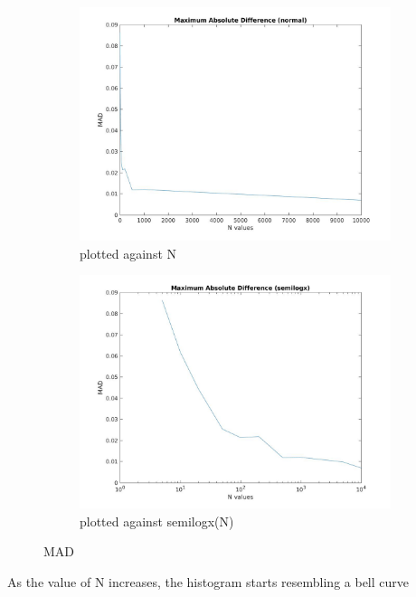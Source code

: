 \documentclass[12pt]{article}
\begin{document}
\begin{figure}[h!]
  \centering
  \begin{subfigure}[b]{0.4\linewidth}
    \includegraphics[width=\linewidth]{jpgs/mad.jpg}
    \caption{plotted against N}
  \end{subfigure}
  \begin{subfigure}[b]{0.4\linewidth}
    \includegraphics[width=\linewidth]{jpgs/mad_semilogx.jpg}
    \caption{plotted against semilogx(N)}
  \end{subfigure}
  \caption{MAD}
\end{figure}

As the value of N increases, the histogram starts resembling a bell curve
\newpage
\end{document}
